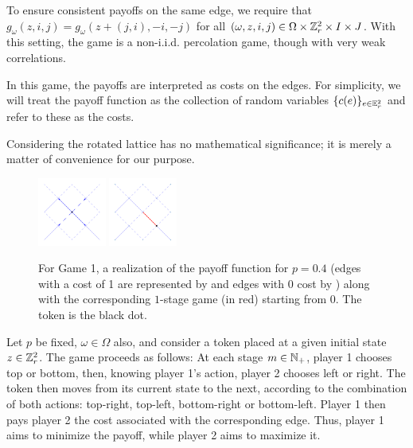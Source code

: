         To ensure consistent payoffs on the same edge, we require that $g_{\omega}(z, i, j) = g_{\omega}(z + (j, i), -i, -j)$ for all $(\omega, z, i, j) \in \Omega \times \mathbb{Z}_r^2 \times I \times J$. With this setting, the game is a non-i.i.d. percolation game, though with very weak correlations.

        In this game, the payoffs are interpreted as costs on the edges. For simplicity, we will treat the payoff function as the collection of random variables $\{c(e)\}_{e \in \mathbb{E}_r^2}$ and refer to these as the costs. 

    	\begin{remark} 
    		Considering the rotated lattice has no mathematical significance; it is merely a matter of convenience for our purpose.
    	\end{remark} 

        \begin{figure}[!hbt]
            \centering
            \includegraphics[width = 0.2\textwidth]{./images/game1/L5grid_arrowsit0p040.png}            
            \includegraphics[width = 0.2\textwidth]{./images/game1/L5opit1p040.png}
            \caption{For Game 1, a realization of the payoff function for $p = 0.4$ (edges with a cost of 1 are represented by \protect\costOne and edges with 0 cost by \protect\costZero) along with the corresponding $1$-stage game (in red) starting from 0. The token is the black dot.}
        \end{figure}

    	Let $p$ be fixed, $\omega \in \Omega$ also, and consider a token placed at a given initial state $z \in \mathbb{Z}_r^2$. The game proceeds as follows: At each stage $m \in \mathbb{N}_+$, player 1 chooses top or bottom, then, knowing player 1's action, player 2 chooses left or right. The token then moves from its current state to the next, according to the combination of both actions: top-right, top-left, bottom-right or bottom-left. Player 1 then pays player 2 the cost associated with the corresponding edge. Thus, player 1 aims to minimize the payoff, while player 2 aims to maximize it.
        
